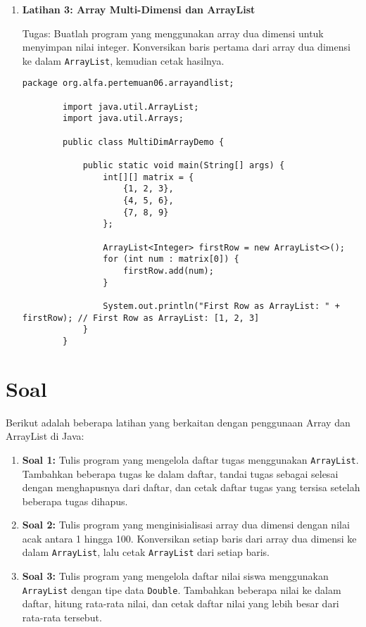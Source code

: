 \begin{enumerate}
	\item \textbf{Latihan 3: Array Multi-Dimensi dan ArrayList}
	
	Tugas: Buatlah program yang menggunakan array dua dimensi untuk menyimpan nilai integer. Konversikan baris pertama dari array dua dimensi ke dalam \texttt{ArrayList}, kemudian cetak hasilnya.
	
	\begin{lstlisting}[style=JavaStyle]
		package org.alfa.pertemuan06.arrayandlist;
		
		import java.util.ArrayList;
		import java.util.Arrays;
		
		public class MultiDimArrayDemo {
			
			public static void main(String[] args) {
				int[][] matrix = {
					{1, 2, 3},
					{4, 5, 6},
					{7, 8, 9}
				};
				
				ArrayList<Integer> firstRow = new ArrayList<>();
				for (int num : matrix[0]) {
					firstRow.add(num);
				}
				
				System.out.println("First Row as ArrayList: " + firstRow); // First Row as ArrayList: [1, 2, 3]
			}
		}
	\end{lstlisting}
\end{enumerate}

\section{Soal}

Berikut adalah beberapa latihan yang berkaitan dengan penggunaan Array dan ArrayList di Java:

\begin{enumerate}
	
	\item \textbf{Soal 1:} Tulis program yang mengelola daftar tugas menggunakan \texttt{ArrayList}. Tambahkan beberapa tugas ke dalam daftar, tandai tugas sebagai selesai dengan menghapusnya dari daftar, dan cetak daftar tugas yang tersisa setelah beberapa tugas dihapus.
	
	\item \textbf{Soal 2:} Tulis program yang menginisialisasi array dua dimensi dengan nilai acak antara 1 hingga 100. Konversikan setiap baris dari array dua dimensi ke dalam \texttt{ArrayList}, lalu cetak \texttt{ArrayList} dari setiap baris.
	
	\item \textbf{Soal 3:} Tulis program yang mengelola daftar nilai siswa menggunakan \texttt{ArrayList} dengan tipe data \texttt{Double}. Tambahkan beberapa nilai ke dalam daftar, hitung rata-rata nilai, dan cetak daftar nilai yang lebih besar dari rata-rata tersebut.
	
\end{enumerate}

